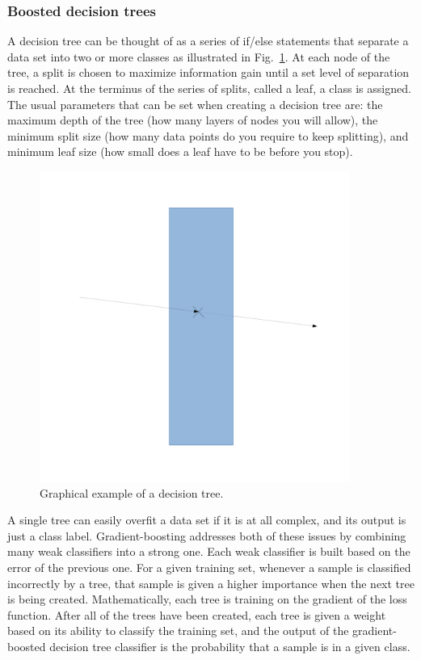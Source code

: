  \subsubsection{Boosted decision trees}\label{sec:decisiontrees}
    A decision tree can be thought of as a series of if/else statements that
    separate a data set into two or more classes as illustrated in
    Fig.~\ref{fig:dtree}. At each node of the tree, a split is chosen to
    maximize information gain until a set level of separation is reached.  At
    the terminus of the series of splits, called a leaf, a class is assigned.
    The usual parameters that can be set when creating a decision tree are: the
    maximum depth of the tree (how many layers of nodes you will allow), the
    minimum split size (how many data points do you require to keep splitting),
    and minimum leaf size (how small does a leaf have to be before you stop). 
    \begin{figure}[ht]
      \centering
      \includegraphics[angle=0,width=4in]{figures/bz.pdf}
      \caption{Graphical example of a decision tree.}
      \label{fig:dtree}
    \end{figure}
    
    A single tree can easily overfit a data set if it is at all complex, and
    its output is just a class label. Gradient-boosting addresses both of these
    issues by combining many weak classifiers into a strong one. Each weak
    classifier is built based on the error of the previous one. For a given
    training set, whenever a sample is classified incorrectly by a tree, that
    sample is given a higher importance when the next tree is being created.
    Mathematically, each tree is training on the gradient of the loss function.
    After all of the trees have been created, each tree is given a weight based
    on its ability to classify the training set, and the output of the
    gradient-boosted decision tree classifier is the probability that a sample
    is in a given class.
    
